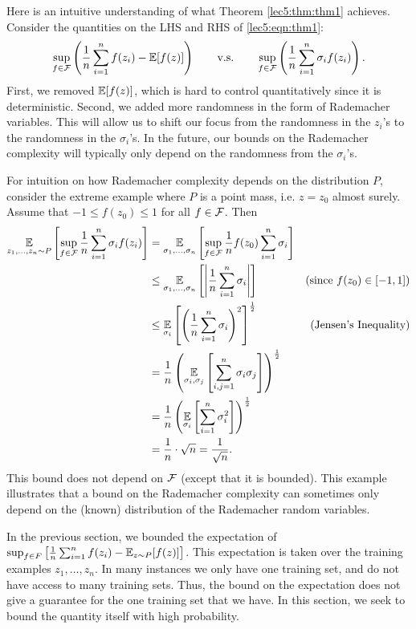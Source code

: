 Here is an intuitive understanding of what Theorem \ref{lec5:thm:thm1} achieves. Consider the quantities on the LHS and RHS of \eqref{lec5:eqn:thm1}:
\begin{align*}
    \sup_{f\in \mathcal F} \left(\frac{1}{n} \sum_{i=1}^n f(z_i) - \operatorname*{\mathbb{E}}[f(z)]\right) \qquad \text{v.s.} \qquad \sup_{f\in \mathcal F} \left(\frac{1}{n} \sum_{i=1}^n \sigma_i f(z_i)\right).
\end{align*}
First, we removed $\operatorname*{\mathbb{E}}[f(z)]$, which is hard to control quantitatively since it is deterministic. Second, we added more randomness in the form of Rademacher variables. This will allow us to shift our focus from the randomness in the $z_i$'s to the randomness in the $\sigma_i$'s. In the future, our bounds on the Rademacher complexity will typically only depend on the randomness from the $\sigma_i$'s.

For intuition on how Rademacher complexity depends on the distribution $P$, consider the extreme example where $P$ is a point mass, i.e. $z = z_0$ almost surely. Assume that $-1 \leq f(z_0) \leq 1$ for all $f \in \mathcal F$. Then
\begin{align}
    \operatorname*{\mathbb{E}}_{z_1, \dots, z_n \sim P} \left[ \sup_{f \in \mathcal F} \frac{1}{n} \sum^n_{i=1} \sigma_i f(z_i)\right]
    &= \operatorname*{\mathbb{E}}_{\sigma_1, \dots, \sigma_n} \left[ \sup_{f \in \mathcal F} \frac{1}{n}f(z_0) \sum^n_{i=1} \sigma_i \right] \\
    &\leq \operatorname*{\mathbb{E}}_{\sigma_1, \dots, \sigma_n} \left[ \left| \frac{1}{n} \sum^n_{i=1} \sigma_i \right|\right] &(\text{since } f(z_0) \in [-1,1]) \\
    &\leq \operatorname*{\mathbb{E}}_{\sigma_i} \left[ \left( \frac{1}{n} \sum^n_{i=1} \sigma_i \right)^2\right]^\frac{1}{2} &(\text{Jensen's Inequality}) \\
    &= \frac{1}{n}\left( \operatorname*{\mathbb{E}}_{\sigma_i, \sigma_j} \left[ \sum^n_{i, j=1} \sigma_i\sigma_j \right] \right)^\frac{1}{2}\\
    &= \frac{1}{n}\left( \operatorname*{\mathbb{E}}_{\sigma_i} \left[ \sum^n_{i=1} \sigma_i^2 \right] \right)^\frac{1}{2} \\
    &= \frac{1}{n} \cdot \sqrt{n} = \frac{1}{\sqrt{n}}.
\end{align}
This bound does not depend on $\mathcal F$ (except that it is bounded). This example illustrates that a bound on the Rademacher complexity can sometimes only depend on the (known) distribution of the Rademacher random variables.


In the previous section, we bounded the expectation of $\sup_{f\in F} \left[ \frac{1}{n} \sum^n_{i=1} f(z_i) -  \operatorname*{\mathbb{E}}_{z\sim P} [f(z)] \right]$. This expectation is taken over the training examples $z_1, \dots, z_n$. In many instances we only have one training set, and do not have access to many training sets. Thus, the bound on the expectation does not give a guarantee for the one training set that we have. In this section, we seek to bound the quantity itself with high probability.

